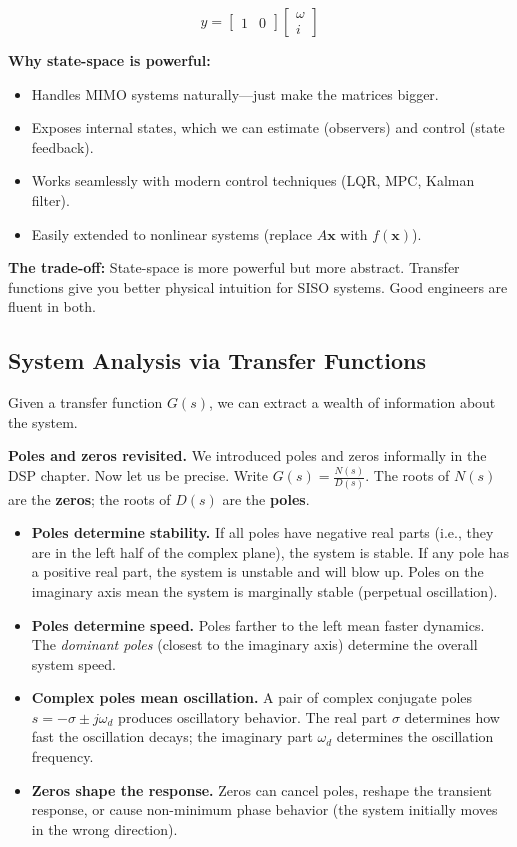 \begin{equation}
y = \begin{bmatrix} 1 & 0 \end{bmatrix} \begin{bmatrix} \omega \\ i \end{bmatrix}
\end{equation}

\textbf{Why state-space is powerful:}
\begin{itemize}
    \item Handles MIMO systems naturally---just make the matrices bigger.
    \item Exposes internal states, which we can estimate (observers) and control (state feedback).
    \item Works seamlessly with modern control techniques (LQR, MPC, Kalman filter).
    \item Easily extended to nonlinear systems (replace $A\mathbf{x}$ with $f(\mathbf{x})$).
\end{itemize}

\textbf{The trade-off:} State-space is more powerful but more abstract. Transfer functions give you better physical intuition for SISO systems. Good engineers are fluent in both.

\subsection{System Analysis via Transfer Functions}
\label{sec:system_analysis_tf}

Given a transfer function $G(s)$, we can extract a wealth of information about the system.

\textbf{Poles and zeros revisited.} We introduced poles and zeros informally in the DSP chapter. Now let us be precise. Write $G(s) = \frac{N(s)}{D(s)}$. The roots of $N(s)$ are the \textbf{zeros}; the roots of $D(s)$ are the \textbf{poles}.

\begin{itemize}
    \item \textbf{Poles determine stability.} If all poles have negative real parts (i.e., they are in the left half of the complex plane), the system is stable. If any pole has a positive real part, the system is unstable and will blow up. Poles on the imaginary axis mean the system is marginally stable (perpetual oscillation).
    \item \textbf{Poles determine speed.} Poles farther to the left mean faster dynamics. The \textit{dominant poles} (closest to the imaginary axis) determine the overall system speed.
    \item \textbf{Complex poles mean oscillation.} A pair of complex conjugate poles $s = -\sigma \pm j\omega_d$ produces oscillatory behavior. The real part $\sigma$ determines how fast the oscillation decays; the imaginary part $\omega_d$ determines the oscillation frequency.
    \item \textbf{Zeros shape the response.} Zeros can cancel poles, reshape the transient response, or cause non-minimum phase behavior (the system initially moves in the wrong direction).
\end{itemize}

